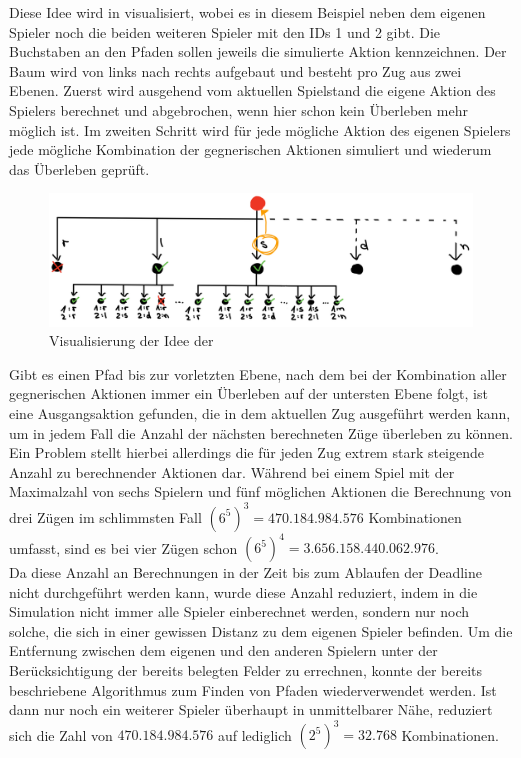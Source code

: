 Diese Idee wird in  visualisiert, wobei es in diesem Beispiel neben dem
eigenen Spieler noch die beiden weiteren Spieler mit den IDs 1 und 2 gibt.
Die Buchstaben an den Pfaden sollen jeweils die simulierte Aktion kennzeichnen.
Der Baum wird von links nach rechts aufgebaut und besteht pro Zug aus zwei Ebenen.
Zuerst wird ausgehend vom aktuellen Spielstand die eigene Aktion des Spielers berechnet und abgebrochen, wenn hier schon
kein Überleben mehr möglich ist.
Im zweiten Schritt wird für jede mögliche Aktion des eigenen Spielers jede mögliche Kombination der gegnerischen
Aktionen simuliert und wiederum das Überleben geprüft. \\

\begin{figure}[htb]
\centering
\includegraphics[width=\textwidth]{Bilder/SearchTreeAIVisualisierung.jpg}
\caption{Visualisierung der Idee der }
\label{fig:SearchTreeAIVisualisierung}
\end{figure}

Gibt es einen Pfad bis zur vorletzten Ebene, nach dem bei der Kombination aller gegnerischen Aktionen immer ein
Überleben auf der untersten Ebene folgt, ist eine Ausgangsaktion gefunden, die in dem aktuellen Zug ausgeführt werden
kann, um in jedem Fall die Anzahl der nächsten berechneten Züge überleben zu können. \\

Ein Problem stellt hierbei allerdings die für jeden Zug extrem stark steigende Anzahl zu berechnender Aktionen dar.
Während bei einem Spiel mit der Maximalzahl von sechs Spielern und fünf möglichen Aktionen die Berechnung von drei Zügen
im schlimmsten Fall $(6 ^ 5) ^ 3 = 470.184.984.576$ Kombinationen umfasst, sind es bei vier Zügen schon
$(6 ^ 5) ^ 4 = 3.656.158.440.062.976$. \\

Da diese Anzahl an Berechnungen in der Zeit bis zum Ablaufen der Deadline nicht durchgeführt werden kann, wurde diese
Anzahl reduziert, indem in die Simulation nicht immer alle Spieler einberechnet werden, sondern nur noch solche,
die sich in einer gewissen Distanz zu dem eigenen Spieler befinden.
Um die Entfernung zwischen dem eigenen und den anderen Spielern unter der Berücksichtigung der bereits belegten Felder
zu errechnen, konnte der bereits beschriebene Algorithmus zum Finden von Pfaden wiederverwendet werden.
Ist dann \bspw nur noch ein weiterer Spieler überhaupt in unmittelbarer Nähe, reduziert sich die Zahl von
$470.184.984.576$ auf lediglich $(2 ^ 5) ^ 3 = 32.768$ Kombinationen.

